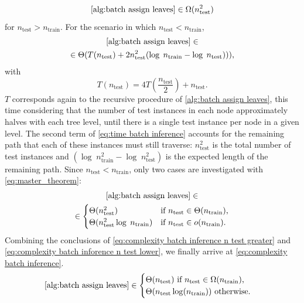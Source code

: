 \begin{appendices}
\begin{equation}
    \label{eq:complexity batch inference n test greater}
    \text{\ref{alg:batch assign leaves}}
    \in \Omega(n_\text{test}^2)
\end{equation}
for $n_\text{test} > n_\text{train}$.
For the scenario in which $n_\text{test} < n_\text{train}$,
%
\begin{multline}
    \label{eq:time batch inference}
    \text{\ref{alg:batch assign leaves}}%
    \in
        \\
        \in \Theta(
            T(n_\text{test}) 
            + 2 n_\text{test}^2 (\log\;n_\text{train} - \log\; n_\text{test}))
        )
    \text{,}
\end{multline}
%
with
%
\begin{equation}
    T(n_\text{test}) = 4T\left(\frac{n_\text{test}}{2}\right) + n_\text{test}
    \text{.}
    \label{eq:recurrence predict 2}
\end{equation}
%
$T$ corresponds again to the recursive procedure of \ref{alg:batch assign leaves}, this time considering that the number of test instances in each node approximately halves with each tree level, until there is a single test instance per node in a given level. The second term of \cref{eq:time batch inference} accounts for the remaining path that each of these instances must still traverse: $n_\text{test}^2$ is the total number of test instances and $(\log\;n^2_\text{train} - \log\; n^2_\text{test})$ is the expected length of the remaining path.
Since $n_\text{test} < n_\text{train}$, only two cases are investigated with \cref{eq:master_theorem}:
%
\begin{multline}
    \label{eq:complexity batch inforence n test lower}
    \text{\ref{alg:batch assign leaves}}%
        \in\\
        \in \begin{cases}
            \Theta(n_\text{test}^2) & \text{if }n_\text{test} \in \Theta(n_\text{train})\text{,}\\
            \Theta(n_\text{test}^2 \log\;n_\text{train}) & \text{if }n_\text{test} \in o(n_\text{train})
            \text{.}
        \end{cases}
\end{multline}
%
Combining the conclusions of \cref{eq:complexity batch inference n test greater} and \cref{eq:complexity batch inforence n test lower}, we finally arrive at \cref{eq:complexity batch inference}.
\begin{align}
    \label{eq:complexity batch inference}
    \text{\ref{alg:batch assign leaves}}
        \in \begin{cases}
            \Theta(n_\text{test}) \text{ if }n_\text{test} \in \Omega(n_\text{train})\text{,}\\
            \Theta(n_\text{test} \log(n_\text{train})) \text{ otherwise.}
        \end{cases}
\end{align}


\end{appendices}
